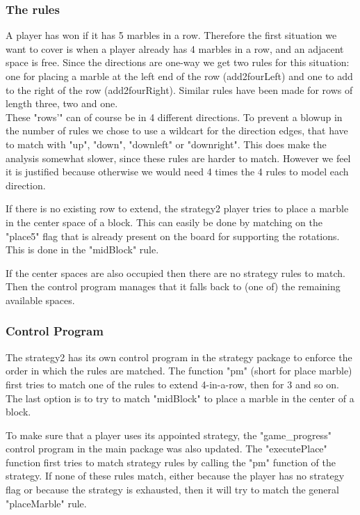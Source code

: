 \subsubsection{The rules}

A player has won if it has 5 marbles in a row. Therefore the first situation we want to cover is when a player already has 4 marbles in a row, and an adjacent space is free.
Since the directions are one-way we get two rules for this situation: one for placing a marble at the left end of the row (add2fourLeft) and one to add to the right of the row (add2fourRight).
Similar rules have been made for rows of length three, two and one.\\
These "rows'" can of course be in 4 different directions. To prevent a blowup in the number of rules we chose to use a wildcart for the direction edges, that have to match with "up", "down", "downleft" or "downright".
This does make the analysis somewhat slower, since these rules are harder to match. However we feel it is justified because otherwise we would need 4 times the 4 rules to model each direction.

If there is no existing row to extend, the strategy2 player tries to place a marble in the center space of a block. This can easily be done by matching on the "place5" flag that is already present on the board for supporting the rotations. This is done in the "midBlock" rule.

If the center spaces are also occupied then there are no strategy rules to match. Then the control program manages that it falls back to (one of) the remaining available spaces.

\subsubsection{Control Program}

The strategy2 has its own control program in the strategy package to enforce the order in which the rules are matched.
The function "pm" (short for place marble) first tries to match one of the rules to extend 4-in-a-row, then for 3 and so on. The last option is to try to match "midBlock" to place a marble in the center of a block.

To make sure that a player uses its appointed strategy, the "game\_progress" control program in the main package was also updated.
The "executePlace" function first tries to match strategy rules by calling the "pm" function of the strategy. If none of these rules match, either because the player has no strategy flag or because the strategy is exhausted, then it will try to match the general "placeMarble" rule.

